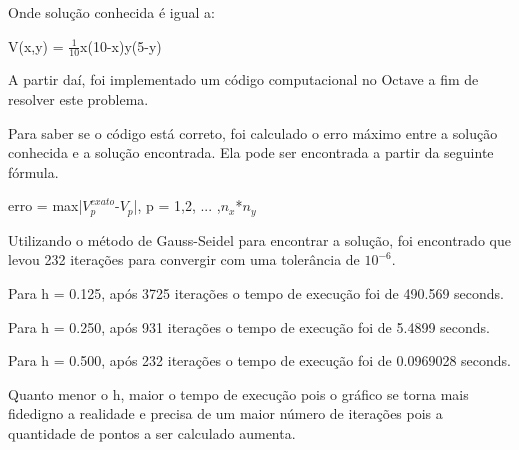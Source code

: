 \documentclass[
12pt,				%
oneside,			%
a4paper,			%
english,			%
french,				%
spanish,			%
brazil				%
]{abntex2}
\begin{document}
Onde solução conhecida é igual a:

\begin{center}

V(x,y) = $\frac{1}{10}$x(10-x)y(5-y)
\end{center} 

A partir daí, foi implementado um código computacional no Octave a fim de resolver este problema.

Para saber se o código está correto, foi calculado o erro máximo entre a solução conhecida e a solução encontrada. Ela pode ser encontrada a partir da seguinte fórmula.
\begin{center} erro = max|$V_p^{exato}$-$V_p$|, p = 1,2, ... ,$n_x$*$n_y$\end{center}

Utilizando o  método de Gauss-Seidel para encontrar a solução, foi encontrado que levou 232 iterações para convergir com uma tolerância de $10^{-6}$.

Para h = 0.125, após 3725 iterações o tempo de execução foi de 490.569 seconds.

Para h = 0.250, após 931 iterações o tempo de execução foi de 5.4899 seconds.

Para h = 0.500, após 232 iterações o tempo de execução foi de 0.0969028 seconds.


Quanto menor o h, maior o tempo de execução pois o gráfico se torna mais fidedigno a realidade e precisa de um maior número de iterações pois a quantidade de pontos a ser calculado aumenta.


\newpage
\end{document}
